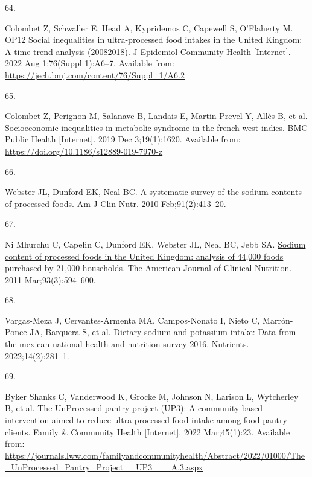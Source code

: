 \documentclass[
]{article}
\newlength{\cslhangindent}
\newlength{\csllabelwidth}
\newlength{\cslentryspacingunit} %
\newenvironment{CSLReferences}[2] %
 {%
  \setlength{\parindent}{0pt}
  \ifodd #1
  \let\oldpar\par
  \def\par{\hangindent=\cslhangindent\oldpar}
  \fi
  \setlength{\parskip}{#2\cslentryspacingunit}
 }%
 {}
\newcommand{\CSLLeftMargin}[1]{\parbox[t]{\csllabelwidth}{#1}}
\newcommand{\CSLRightInline}[1]{\parbox[t]{\linewidth - \csllabelwidth}{#1}\break}
\begin{document}
\begin{CSLReferences}{0}{0}
\leavevmode{}%
\CSLLeftMargin{64. }%
\CSLRightInline{Colombet Z, Schwaller E, Head A, Kypridemos C, Capewell
S, O'Flaherty M. OP12 Social inequalities in ultra-processed food
intakes in the United Kingdom: A time trend analysis
(2008{\textendash}2018). J Epidemiol Community Health {[}Internet{]}.
2022 Aug 1;76(Suppl 1):A6--7. Available from:
\url{https://jech.bmj.com/content/76/Suppl_1/A6.2}}

\leavevmode{}%
\CSLLeftMargin{65. }%
\CSLRightInline{Colombet Z, Perignon M, Salanave B, Landais E,
Martin-Prevel Y, Allès B, et al. Socioeconomic inequalities in metabolic
syndrome in the french west indies. BMC Public Health {[}Internet{]}.
2019 Dec 3;19(1):1620. Available from:
\url{https://doi.org/10.1186/s12889-019-7970-z}}

\leavevmode{}%
\CSLLeftMargin{66. }%
\CSLRightInline{Webster JL, Dunford EK, Neal BC.
\href{https://doi.org/10.3945/ajcn.2009.28688}{A systematic survey of
the sodium contents of processed foods}. Am J Clin Nutr. 2010
Feb;91(2):413--20. }

\leavevmode{}%
\CSLLeftMargin{67. }%
\CSLRightInline{Ni Mhurchu C, Capelin C, Dunford EK, Webster JL, Neal
BC, Jebb SA. \href{https://doi.org/10.3945/ajcn.110.004481}{Sodium
content of processed foods in the United Kingdom: analysis of 44,000
foods purchased by 21,000 households}. The American Journal of Clinical
Nutrition. 2011 Mar;93(3):594--600. }

\leavevmode{}%
\CSLLeftMargin{68. }%
\CSLRightInline{Vargas-Meza J, Cervantes-Armenta MA, Campos-Nonato I,
Nieto C, Marrón-Ponce JA, Barquera S, et al. Dietary sodium and
potassium intake: {Data} from the mexican national health and nutrition
survey 2016. Nutrients. 2022;14(2):281--1. }

\leavevmode{}%
\CSLLeftMargin{69. }%
\CSLRightInline{Byker Shanks C, Vanderwood K, Grocke M, Johnson N,
Larison L, Wytcherley B, et al. The UnProcessed pantry project (UP3): A
community-based intervention aimed to reduce ultra-processed food intake
among food pantry clients. Family \& Community Health {[}Internet{]}.
2022 Mar;45(1):23. Available from:
\url{https://journals.lww.com/familyandcommunityhealth/Abstract/2022/01000/The_UnProcessed_Pantry_Project__UP3___A.3.aspx}}


\end{CSLReferences}
\end{document}
